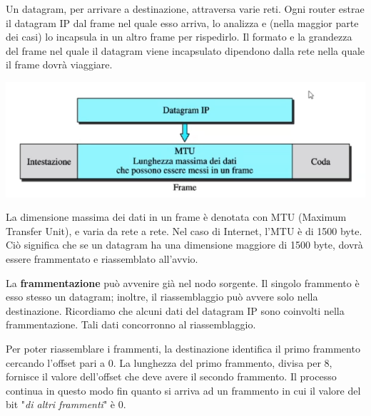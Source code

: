         Un datagram, per arrivare a destinazione, attraversa varie reti. Ogni router estrae il datagram IP dal frame nel quale esso arriva, lo analizza e (nella maggior parte dei casi) lo incapsula in un altro frame per rispedirlo. Il formato e la grandezza del frame nel quale il datagram viene incapsulato dipendono dalla rete nella quale il frame dovrà viaggiare.
        
        \begin{center}
            \includegraphics[scale=0.5]{images/MTU.png}
        \end{center}
        
        La dimensione massima dei dati in un frame è denotata con MTU (Maximum Transfer Unit), e varia da rete a rete. Nel caso di Internet, l'MTU è di 1500 byte. Ciò significa che se un datagram ha una dimensione maggiore di 1500 byte, dovrà essere frammentato e riassemblato all'avvio.
        
        \vspace{3mm}
        
        La \textbf{frammentazione} può avvenire già nel nodo sorgente. Il singolo frammento è esso stesso un datagram; inoltre, il riassemblaggio può avvere solo nella destinazione. Ricordiamo che alcuni dati del datagram IP sono coinvolti nella frammentazione. Tali dati concorronno al riassemblaggio.
        
        Per poter riassemblare i frammenti, la destinazione identifica il primo frammento cercando l'offset pari a 0. La lunghezza del primo frammento, divisa per 8, fornisce il valore dell'offset che deve avere il secondo frammento. Il processo continua in questo modo fin quanto si arriva ad un frammento in cui il valore del bit "\textit{di altri frammenti}" è 0.